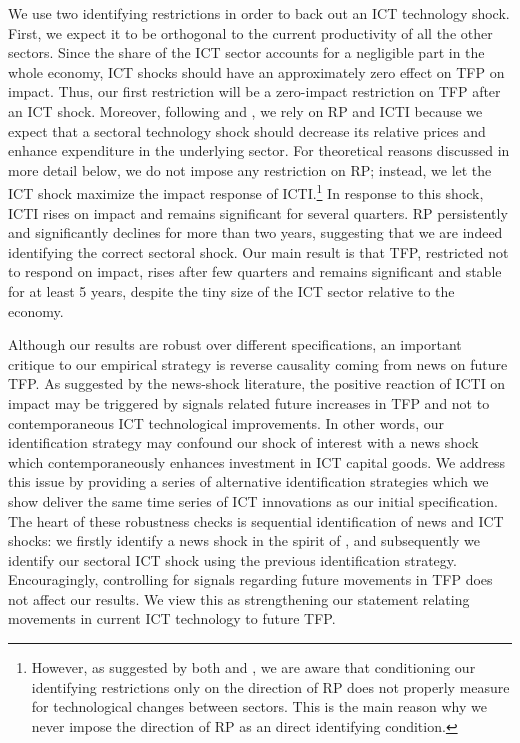 \documentclass[12pt]{article}
\begin{document}
We use two identifying restrictions in order to back out an ICT technology shock. First, we expect it to be orthogonal to the current productivity of all the other sectors. Since the share of the ICT sector accounts for a negligible part in the whole economy, ICT shocks should have an approximately zero effect on TFP on impact. Thus, our first restriction will be a zero-impact restriction on TFP after an ICT shock. Moreover, following \cite{greenwood1997long} and \cite{fisher2006dynamic}, we rely on RP and ICTI because we expect that a sectoral technology shock should decrease its relative prices and enhance expenditure in the underlying sector. For theoretical reasons discussed in more detail below, we do not impose any restriction on RP; instead, we let the ICT shock maximize the impact response of ICTI.\footnote{However, as suggested by both \cite{greenwood2000role} and \cite{basu2010sector}, we are aware that conditioning our identifying restrictions only on the direction of RP does not properly measure for technological changes between sectors. This is the main reason why we never impose the direction of RP as an direct identifying condition.} In response to this shock, ICTI rises on impact and remains significant for several quarters. RP persistently and significantly declines for more than two years, suggesting that we are indeed identifying the correct sectoral shock. Our main result is that TFP, restricted not to respond on impact, rises after few quarters and remains significant and stable for at least 5 years, despite the tiny size of the ICT sector relative to the economy. 

Although our results are robust over different specifications, an important critique to our empirical strategy is reverse causality coming from news on future TFP. As suggested by the news-shock literature, the positive reaction of ICTI on impact may be triggered by signals related future increases in TFP and not to contemporaneous ICT technological improvements. In other words, our identification strategy may confound our shock of interest with a news shock which contemporaneously enhances investment in ICT capital goods. We address this issue by providing a series of alternative identification strategies which we show deliver the same time series of ICT innovations as our initial specification. The heart of these robustness checks is sequential identification of news and ICT shocks: we firstly identify a news shock in the spirit of \cite{barsky2011news}, and subsequently we identify our sectoral ICT shock using the previous identification strategy. Encouragingly, controlling for signals regarding future movements in TFP does not affect our results. We view this as strengthening our statement relating movements in current ICT technology to future TFP. 
\end{document}
